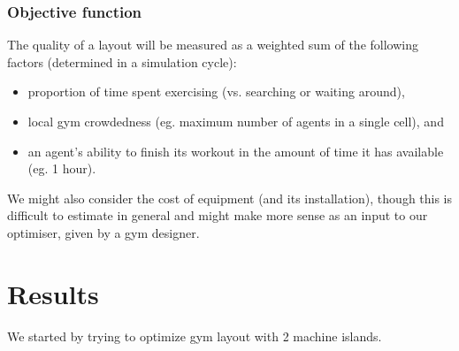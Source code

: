 \documentclass[9pt]{pnas-new}
\begin{document}
\subsubsection*{Objective function}

The quality of a layout will be measured as a weighted sum of the following factors (determined in a simulation cycle): 
\begin{itemize}
	\item proportion of time spent exercising (vs. searching or waiting around),
	\item local gym crowdedness (eg. maximum number of agents in a single cell), and
	\item an agent's ability to finish its workout in the amount of time it has available (eg. 1 hour).
\end{itemize}
We might also consider the cost of equipment (and its installation), though this is difficult to estimate in general and might make more sense as an input to our optimiser, given by a gym designer.


\section*{Results}

We started by trying to optimize gym layout with 2 machine islands. 
\end{document}
